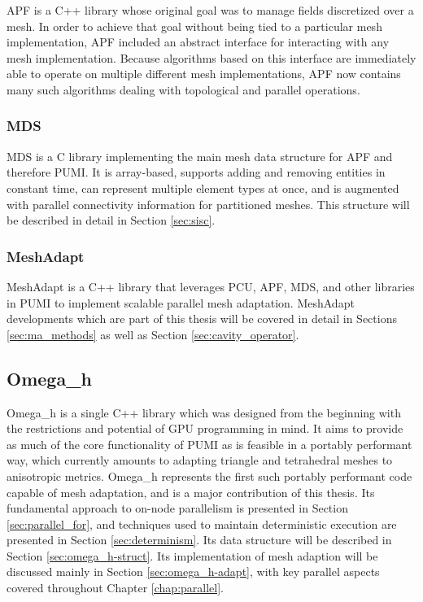 APF is a C++ library whose original goal was to manage fields discretized
over a mesh.
In order to achieve that goal without being tied to a particular mesh
implementation, APF included an abstract interface for interacting
with any mesh implementation.
Because algorithms based on this interface are immediately able to
operate on multiple different mesh implementations, APF now contains
many such algorithms dealing with topological and parallel operations.

\subsubsection{MDS}

MDS is a C library implementing the main mesh data structure for APF and
therefore PUMI.
It is array-based, supports adding and removing entities in constant time,
can represent multiple element types at once, and is augmented with
parallel connectivity information for partitioned meshes.
This structure will be described in detail in Section \ref{sec:sisc}.

\subsubsection{MeshAdapt}

MeshAdapt is a C++ library that leverages PCU, APF, MDS, and other
libraries in PUMI to implement scalable parallel mesh adaptation.
MeshAdapt developments which are part of this thesis will be covered
in detail in Sections \ref{sec:ma_methods} as well as Section
\ref{sec:cavity_operator}.

\subsection{Omega\_h}

Omega\_h is a single C++ library which was designed from the beginning
with the restrictions and potential of GPU programming in mind.
It aims to provide as much of the core functionality of PUMI as
is feasible in a portably performant way, which currently
amounts to adapting triangle and tetrahedral meshes to anisotropic
metrics.
Omega\_h represents the first such portably performant code capable
of mesh adaptation, and is a major contribution of this thesis.
Its fundamental approach to on-node parallelism is
presented in Section \ref{sec:parallel_for}, and techniques
used to maintain deterministic execution are presented
in Section \ref{sec:determinism}.
Its data structure will be described in Section \ref{sec:omega_h-struct}.
Its implementation of mesh adaption will be discussed mainly
in Section \ref{sec:omega_h-adapt}, with key parallel aspects
covered throughout Chapter \ref{chap:parallel}.

